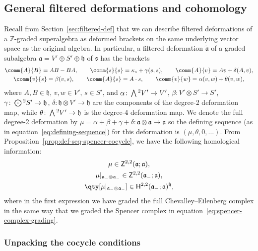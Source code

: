 \documentclass[pdftex]{sigma}
\numberwithin{equation}{section}
\newcommand{\fa}{\mathfrak{a}}
\newcommand{\fh}{\mathfrak{h}}
\newcommand{\fs}{\mathfrak{s}}
\newcommand{\ZZ}{\mathbb{Z}}
\newcommand{\ssH}{\mathsf{H}}
\newcommand{\ssZ}{\mathsf{Z}}
\newcommand{\fatilde}{\widetilde{\fa}}
\newcommand{\Wedge}{\mathchoice{{\textstyle\bigwedge}}{\bigwedge}{\bigwedge}{\bigwedge}}	%
\newcommand{\Odot}{\mathchoice{{\textstyle\bigodot}}{\bigodot}{\bigodot}{\bigodot}}
\newcommand{\1}{\mathbbm{1}}
\begin{document}
\subsection{General filtered deformations and cohomology}
\label{sec:filtered-def-cohom}

Recall from Section~\ref{sec:filtered-def} that we can describe filtered deformations of a $\ZZ$-graded superalgebra as deformed brackets on the same underlying vector space as the original algebra. In particular, a filtered deformation $\fatilde$ of a graded subalgebra $\fa=V'\oplus S'\oplus \fh$ of $\fs$ has the brackets
\begin{gather}
	\comm{A}{B} = AB-BA,\qquad
	\comm{s}{s} = \kappa_s + \gamma(s,s),\qquad
	\comm{A}{v} = Av + \delta(A,v),
	\nonumber\\
	\comm{v}{s} = \beta(v,s),\qquad\comm{A}{s} = A\cdot s
	, \qquad\comm{v}{w} = \alpha(v,w) + \theta(v,w),\label{eq:def-brackets-general}
\end{gather}
where $A,B\in\fh$, $v,w\in V'$, $s\in S'$, and
$\alpha\colon \Wedge^2V' \to V'$, $
	\beta\colon V'\otimes S' \to S'$, $
	\gamma\colon \Odot^2 S' \to \fh$, $
	\delta\colon \fh\otimes V' \to \fh
$
are the components of the degree-2 deformation map, while
$\theta\colon \Wedge^2 V' \to \fh
$
is the degree-4 deformation map. We denote the full degree-2 deformation by
${\mu=\alpha+\beta+\gamma+\delta\colon \fa\otimes\fa \to \fa}
$
so the defining sequence (as in equation~\eqref{eq:defining-sequence}) for this deformation is $(\mu,\theta,0,\dots)$. From Proposition~\ref{prop:def-seq-spencer-cocycle}, we have the following homological information:
\begin{gather}
	\mu \in \ssZ^{2,2}(\fa;\fa),	\label{eq:mu-CE-cocycle}	\\
	\mu|_{\fa_-\otimes\fa_-} \in \ssZ^{2,2}(\fa_-;\fa),	\label{eq:mu-spencer-cocycle}	\\
	\qty[\mu|_{\fa_-\otimes\fa_-}] \in \ssH^{2,2}(\fa_-;\fa)^\fh, \label{eq:mu-invt-class}
\end{gather}
where in the first expression we have graded the full Chevalley--Eilenberg complex in the same way that we graded the Spencer complex in equation~\eqref{eq:spencer-complex-grading}.

\subsubsection{Unpacking the cocycle conditions}
\end{document}
